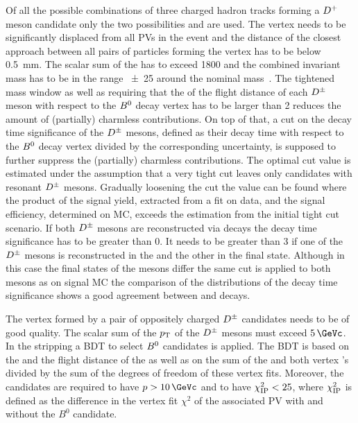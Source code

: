 Of all the possible combinations of three charged hadron tracks forming a
${{D}^+}$ meson candidate only the two possibilities \DToKpipi and \DToKKpi are
used. The vertex needs to be significantly displaced from all PVs in the event
and the distance of the closest approach between all pairs of particles
forming the vertex has to be below \SI{0.5}{\mm}. The scalar sum of the \pT
has to exceed \SI{1800}{\MeVc} and the combined invariant mass has to be in
the range \SI{\pm25}{\MeVcc} around the nominal \Dp mass~\cite{PDG2014}. The
tightened mass window as well as requiring that the \chisq of the flight
distance of each ${{D}^\pm}$ meson with respect to the ${{B}^0}$ decay vertex has to be
larger than \num{2} reduces the amount of (partially) charmless contributions.
On top of that, a cut on the decay time significance of the ${{D}^\pm}$ mesons,
defined as their decay time with respect to the ${{B}^0}$ decay vertex divided by
the corresponding uncertainty, is supposed to further suppress the (partially)
charmless contributions. The optimal cut value is estimated under the
assumption that a very tight cut leaves only candidates with resonant ${{D}^\pm}$
mesons. Gradually loosening the cut the value can be found where the product
of the \Bd signal yield, extracted from a fit on data, and the signal
efficiency, determined on MC, exceeds the estimation from the initial tight
cut scenario. If both ${{D}^\pm}$ mesons are reconstructed via \DToKpipi decays the
decay time significance has to be greater than \num{0}. It needs to be greater
than \num{3} if one of the ${{D}^\pm}$ mesons is reconstructed in the \KKpi and the
other in the \Kpipi final state. Although in this case the final states
of the \Dpm mesons differ the same cut is applied to both \Dpm mesons as on
signal MC the comparison of the distributions of the decay time significance
shows a good agreement between \DToKpipi and \DToKKpi decays.

The vertex formed by a pair of oppositely charged ${{D}^\pm}$ candidates needs to
be of good quality. The scalar sum of the $p_{\text{T}}$ of the ${{D}^\pm}$ mesons must
exceed $\SI{5}{\GeVc}$. In the stripping a BDT to select ${{B}^0}$ candidates is
applied. The BDT is based on the \pT and the flight distance \chisq of the \Bz
as well as on the sum of the \Bz and both \PD vertex \chisq's divided by the
sum of the degrees of freedom of these vertex fits. Moreover, the \Bd
candidates are required to have $p > \SI{10}{\GeVc}$ and to have
$\chi^2_{\text{IP}}<\num{25}$, where $\chi^2_{\text{IP}}$ is defined as the difference in the
vertex fit $\chi^2$ of the associated PV with and without the $B^0$ candidate.

